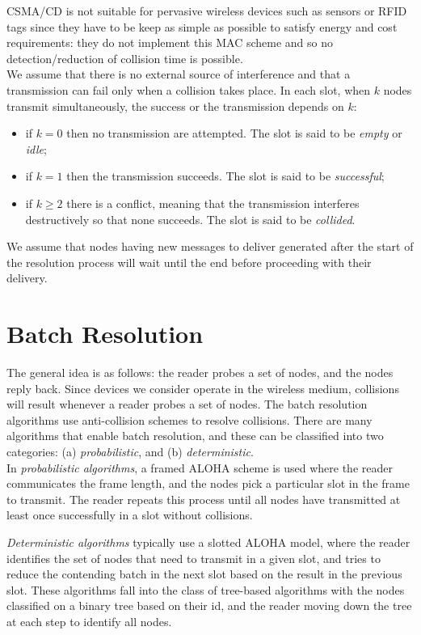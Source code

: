 \documentclass[12pt,a4paper]{report}
\begin{document}
CSMA/CD is not suitable for pervasive wireless devices such as sensors or RFID tags since they have to be keep as simple as possible to satisfy energy and cost requirements: they do not implement this MAC scheme and so no detection/reduction of collision time is possible.\\

We assume that there is no external source of interference and that a transmission can fail only when a collision takes place.
In each slot, when $k$ nodes transmit simultaneously, the success or the transmission depends on $k$:
\begin{itemize}
\item if $k=0$ then no transmission are attempted. The slot is said to be \emph{empty} or \emph{idle};
\item if $k=1$ then the transmission succeeds. The slot is said to be \emph{successful};
\item if $k\geq 2$ there is a conflict, meaning that the transmission interferes destructively so that none succeeds. The slot is said to be \emph{collided}.
\end{itemize}

We assume that nodes having new messages to deliver generated after the start of the resolution process will wait until the end before proceeding with their delivery.

\chapter{Batch Resolution}

The general idea is as follows: the reader probes a set of nodes, and the nodes reply back. 
Since devices we consider operate in the wireless medium, collisions will result whenever a reader probes a set of nodes. The batch resolution algorithms use anti-collision schemes to resolve collisions.
There are many algorithms that enable batch resolution, and these can be classified into two categories: (a) \emph{probabilistic}, and (b) \emph{deterministic}.\\

In \emph{probabilistic algorithms}, a framed ALOHA scheme is used where the reader communicates the frame length, and the nodes pick a particular slot in the frame to transmit. The reader repeats this process until all nodes have transmitted at least once successfully in a slot without collisions. 


\emph{Deterministic algorithms} typically use a slotted ALOHA model, where the reader identifies the set of nodes that need to transmit in a given slot, and tries to reduce the contending batch in the next slot based on the result in the previous slot. These algorithms fall into the class of tree-based algorithms with the nodes classified on a binary tree based on their id, and the reader moving down the tree at each step to identify all nodes. \\
\end{document}
